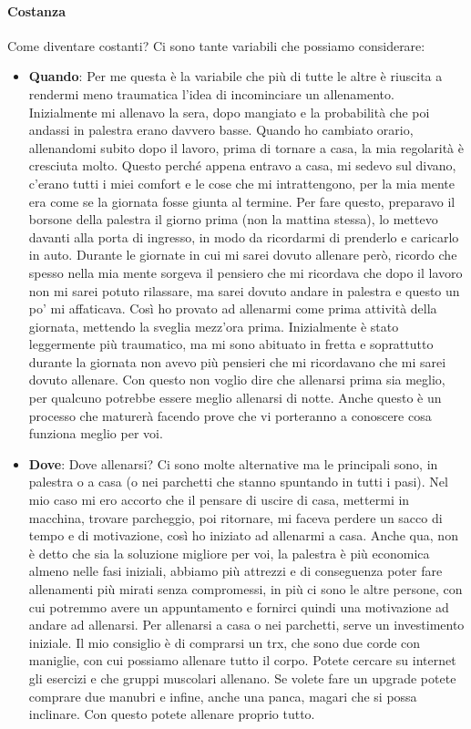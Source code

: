 \documentclass[12pt]{book} %
\begin{document}
\paragraph{Costanza}

Come diventare costanti?
Ci sono tante variabili che possiamo considerare:

\begin{itemize}
\item \textbf{Quando}: Per me questa è la variabile che più di tutte le altre è riuscita a rendermi meno traumatica l'idea di incominciare un allenamento. Inizialmente mi allenavo la sera, dopo mangiato e la probabilità che poi andassi in palestra erano davvero basse. Quando ho cambiato orario, allenandomi subito dopo il lavoro, prima di tornare a casa, la mia regolarità è cresciuta molto. Questo perché appena entravo a casa, mi sedevo sul divano, c'erano tutti i miei comfort e le cose che mi intrattengono, per la mia mente era come se la giornata fosse giunta al termine.
Per fare questo, preparavo il borsone della palestra il giorno prima (non la mattina stessa), lo mettevo davanti alla porta di ingresso, in modo da ricordarmi di prenderlo e caricarlo in auto. 
Durante le giornate in cui mi sarei dovuto allenare però, ricordo che spesso nella mia mente sorgeva il pensiero che mi ricordava che dopo il lavoro non mi sarei potuto rilassare, ma sarei dovuto andare in palestra e questo un po' mi affaticava. Così ho provato ad allenarmi come prima attività della giornata, mettendo la sveglia mezz'ora prima. Inizialmente è stato leggermente più traumatico, ma mi sono abituato in fretta e soprattutto durante la giornata non avevo più pensieri che mi ricordavano che mi sarei dovuto allenare. Con questo non voglio dire che allenarsi prima sia meglio, per qualcuno potrebbe essere meglio allenarsi di notte. Anche questo è un processo che maturerà facendo prove che vi porteranno a conoscere cosa funziona meglio per voi. 

\item \textbf{Dove}: Dove allenarsi? Ci sono molte alternative ma le principali sono, in palestra o a casa (o nei parchetti che stanno spuntando in tutti i pasi). Nel mio caso mi ero accorto che il pensare di uscire di casa, mettermi in macchina, trovare parcheggio, poi ritornare, mi faceva perdere un sacco di tempo e di motivazione, così ho iniziato ad allenarmi a casa. Anche qua, non è detto che sia la soluzione migliore per voi, la palestra è più economica almeno nelle fasi iniziali, abbiamo più attrezzi e di conseguenza poter fare allenamenti più mirati senza compromessi, in più ci sono le altre persone, con cui potremmo avere un appuntamento e fornirci quindi una motivazione ad andare ad allenarsi.
Per allenarsi a casa o nei parchetti, serve un investimento iniziale. Il mio consiglio è di comprarsi un trx, che sono due corde con maniglie, con cui possiamo allenare tutto il corpo. Potete cercare su internet gli esercizi e che gruppi muscolari allenano. Se volete fare un upgrade potete comprare due manubri e infine, anche una panca, magari che si possa inclinare. Con questo potete allenare proprio tutto.


\end{itemize}
\end{document}
